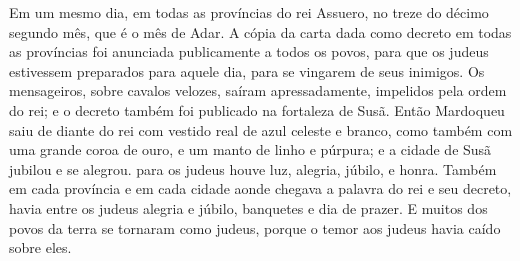 {  Em um mesmo dia, em todas as províncias do rei Assuero, no {} treze do décimo segundo mês, que é o mês de Adar.
  A cópia da carta dada como decreto em todas as províncias foi anunciada publicamente a todos os povos, para que os judeus estivessem preparados para aquele dia, para se vingarem de seus inimigos.
  Os mensageiros, sobre cavalos velozes, saíram apressadamente, impelidos pela ordem do rei; e o decreto também foi publicado na fortaleza de Susã.
  Então Mardoqueu saiu de diante do rei com vestido real de azul celeste e branco, como também com uma grande coroa de ouro, e um manto de linho e púrpura; e a cidade de Susã jubilou e se alegrou.
   para os judeus houve luz, alegria, júbilo, e honra.
  Também em cada província e em cada cidade aonde chegava a palavra do rei e seu decreto, havia entre os judeus alegria e júbilo, banquetes e dia de prazer. E muitos dos povos da terra se tornaram como judeus, porque o temor aos judeus havia caído sobre eles.
\par }

